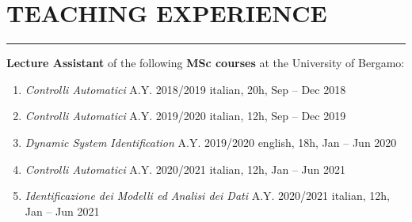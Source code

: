 \documentclass[10pt]{article}
\newcommand{\cvsection}[1]{\section*{\centering\normalsize\uppercase{#1}}\vspace{-16pt}\rule{\linewidth}{0.2pt}\vspace{6pt}}
\begin{document}
\clearpage


\cvsection{teaching experience}

\textbf{Lecture Assistant} of the following \textbf{MSc courses} at the University of Bergamo:
\begin{enumerate}
	\setlength\itemsep{-3pt}
	\item \textit{Controlli Automatici} A.Y. 2018/2019 \hfill italian, 20h, Sep – Dec 2018\\
	\item \textit{Controlli Automatici} A.Y. 2019/2020 \hfill italian, 12h, Sep – Dec 2019\\
	\item \textit{Dynamic System Identification} A.Y. 2019/2020 \hfill english, 18h, Jan – Jun 2020\\
	\item \textit{Controlli Automatici} A.Y. 2020/2021 \hfill italian, 12h, Jan – Jun 2021\\
	\item \textit{Identificazione dei Modelli ed Analisi dei Dati} A.Y. 2020/2021 \hfill italian, 12h, Jan – Jun 2021
\end{enumerate}

\vspace{6pt} %
\end{document}
